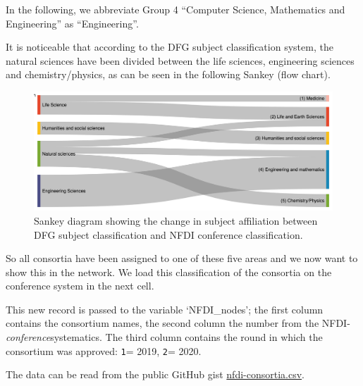 \documentclass[11pt]{article}
\begin{document}
In the following, we abbreviate Group 4 ``Computer Science, Mathematics
and Engineering'' as ``Engineering''.

    It is noticeable that according to the DFG subject classification
system, the natural sciences have been divided between the life
sciences, engineering sciences and chemistry/physics, as can be seen in
the following Sankey (flow chart).

\begin{figure}
\centering
\includegraphics{img/dfg-nfdi-sankey.png}
\caption{Sankey diagram showing the change in subject affiliation
between DFG subject classification and NFDI conference classification.}
\end{figure}

So all consortia have been assigned to one of these five areas and we
now want to show this in the network. We load this classification of the
consortia on the conference system in the next cell.

This new record is passed to the variable `NFDI\_nodes'; the first
column contains the consortium names, the second column the number from
the NFDI-\emph{conference}systematics. The third column contains the
round in which the consortium was approved: \texttt{1}= 2019,
\texttt{2}= 2020.

The data can be read from the public GitHub gist
\href{https://gist.github.com/LukasCBossert/ce56ebd0059b4879c7d11c1090118c25}{nfdi-consortia.csv}.
\end{document}
